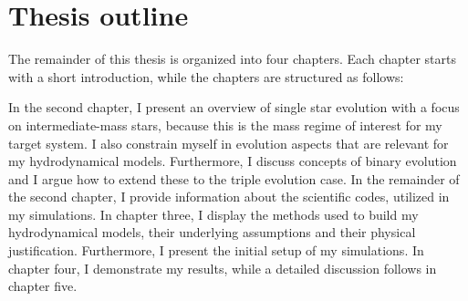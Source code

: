 \section{Thesis outline}

The remainder of this thesis is organized into four chapters. Each chapter starts with a short introduction, while the chapters are structured as follows: 

In the second chapter, I present an overview of single star evolution with a focus on intermediate-mass stars, because this is the mass regime of interest for my target system. I also constrain myself in evolution aspects that are relevant for my hydrodynamical models. Furthermore, I discuss concepts of binary evolution and I argue how to extend these to the triple evolution case. In the remainder of the second chapter, I provide information about the scientific codes, utilized in my simulations. In chapter three, I display the methods used to build my hydrodynamical models, their underlying assumptions and their physical justification. Furthermore, I present the initial setup of my simulations. In chapter four, I demonstrate my results, while a detailed discussion follows in chapter five.

